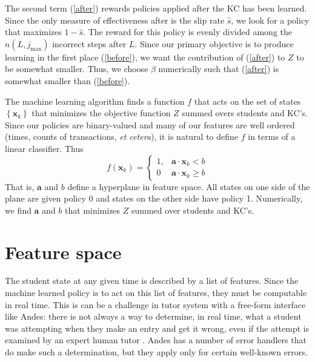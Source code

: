 \documentclass[11pt,letterpaper]{article}
\begin{document}
The second term (\ref{after}) rewards policies applied after
the KC has been learned.  Since the only measure of effectiveness
after is the slip rate $\hat{s}$, we look for a policy that maximizes
$1-\hat{s}$.  The reward for this policy is evenly divided
among the $n(L,j_\mathrm{max})$ incorrect steps after $L$.
Since our primary objective is to produce learning in the first
place (\ref{before}), we want the contribution of (\ref{after})
to $Z$ to be somewhat smaller.  Thus, we choose $\beta$ numerically 
such that (\ref{after}) is somewhat smaller than (\ref{before}).

The machine learning algorithm finds a function $f$ that acts on
the set of states $\left\{\mathbf{x}_k\right\}$ that minimizes
the objective function $Z$ summed overs students and KC's.  
Since our policies are binary-valued
and many of our features are well ordered (times, counts of transactions,
{\em et cetera}), it is natural to define $f$ in terms of a 
linear classifier.  Thus
%
\begin{equation}
              f(\mathbf{x}_k) = \left\{\begin{array}{cc}
		1,& \mathbf{a}\cdot \mathbf{x}_k <b \\
                0 & \mathbf{a}\cdot \mathbf{x}_k \ge b
		\end{array} \right.
\end{equation}
%
That is, $\mathbf{a}$ and $b$ define a hyperplane in feature
space.  All states on one side of the plane are given policy 0
and states on the other side have policy 1.
Numerically, we find $\mathbf{a}$ and $b$ that minimizes $Z$
summed over students and KC's.

\section{Feature space}

The student state at any given time is described by a list of
features.   Since the machine learned policy is to act on this list of
features, they must be computable in real time.  This is can be a
challenge in tutor system with a free-form interface like  Andes:
there is not always a way to determine, in real time, what a student was
attempting when they make an entry and get it wrong, even if the attempt
is examined by an expert human tutor .  Andes has a
number of error handlers that do make such a determination, but they 
apply only for certain well-known errors.
\end{document}
